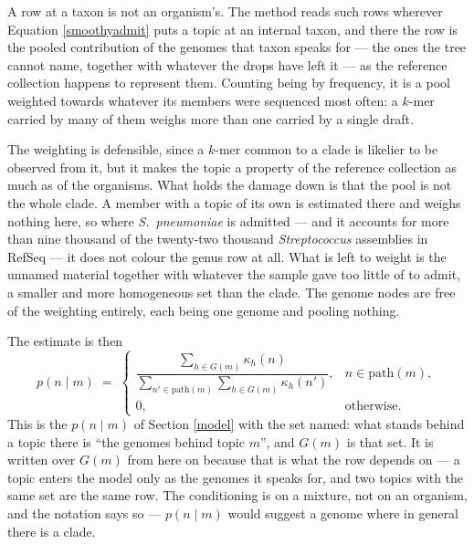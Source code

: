 \documentclass[pdflatex,sn-vancouver-num]{sn-jnl}
\begin{document}
    A row at a taxon is not an organism's. The method reads such rows wherever
    Equation \eqref{smoothyadmit} puts a topic at an internal taxon, and there the row is the pooled
    contribution of the genomes that taxon speaks for --- the ones the tree cannot name, together
    with whatever the drops have left it --- as the reference collection happens to represent them.
    Counting being by frequency, it is a pool weighted towards whatever its members were sequenced
    most often: a $k$-mer carried by many of them weighs more than one carried by a single draft.

    The weighting is defensible, since a $k$-mer common to a clade is likelier to be observed from
    it, but it makes the topic a property of the reference collection as much as of the organisms.
    What holds the damage down is that the pool is not the whole clade. A member with a topic of its
    own is estimated there and weighs nothing here, so where \emph{S.~pneumoniae} is admitted --- and
    it accounts for more than nine thousand of the twenty-two thousand \emph{Streptococcus}
    assemblies in RefSeq --- it does not colour the genus row at all. What is left to weight is the
    unnamed material together with whatever the sample gave too little of to admit, a smaller and
    more homogeneous set than the clade. The genome nodes are free of the weighting entirely, each
    being one genome and pooling nothing.

    The estimate is then
    \begin{equation}\label{smoothypng}
        p(n \mid m) \;=\;
        \begin{cases}
            \dfrac{\sum_{h \in G(m)} \kappa_h(n)}
                  {\sum_{n' \in \mathrm{path}(m)} \sum_{h \in G(m)} \kappa_h(n')} ,
                & n \in \mathrm{path}(m) , \\[2.2ex]
            0 , & \text{otherwise} .
        \end{cases}
    \end{equation}
    This is the $p(n \mid m)$ of Section \ref{model} with the set named: what
    stands behind a topic there is \enquote{the genomes behind topic $m$}, and $G(m)$ is that
    set. It is written over $G(m)$ from here on because that is what the row depends on --- a
    topic enters the model only as the genomes it speaks for, and two topics with the same set are
    the same row. The conditioning is on a mixture, not on an organism, and the
    notation says so --- $p(n \mid m)$ would suggest a genome where in general there is a clade.
\end{document}
